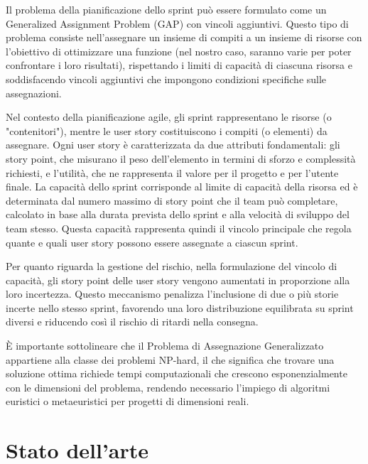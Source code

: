 \documentclass[12pt,a4paper,openright,twoside]{book}
\begin{document}
\vspace{1em}

Il problema della pianificazione dello sprint può essere formulato come un Generalized Assignment Problem (GAP) con vincoli aggiuntivi. Questo tipo di problema consiste nell'assegnare un insieme di compiti a un insieme di risorse con l'obiettivo di ottimizzare una funzione (nel nostro caso, saranno varie per poter confrontare i loro risultati), rispettando i limiti di capacità di ciascuna risorsa e soddisfacendo vincoli aggiuntivi che impongono condizioni specifiche sulle assegnazioni.

\vspace{1em}

Nel  contesto della pianificazione agile, gli sprint rappresentano le risorse (o "contenitori"), mentre le user story costituiscono i compiti (o elementi) da assegnare. Ogni user story è caratterizzata da due attributi fondamentali: gli story point, che misurano il peso dell'elemento in termini di sforzo e complessità richiesti, e l'utilità, che ne rappresenta il valore per il progetto e per l'utente finale. La capacità dello sprint corrisponde al limite di capacità della risorsa ed è determinata dal numero massimo di story point che il team può completare, calcolato in base alla durata prevista dello sprint e alla velocità di sviluppo del team stesso. Questa capacità rappresenta quindi il vincolo principale che regola quante e quali user story possono essere assegnate a ciascun sprint.

\vspace{1em}

Per quanto riguarda la gestione del rischio, nella formulazione del vincolo di capacità, gli story point delle user story vengono aumentati in proporzione alla loro incertezza. Questo meccanismo penalizza l'inclusione di due o più storie incerte nello stesso sprint, favorendo una loro distribuzione equilibrata su sprint diversi e riducendo così il rischio di ritardi nella consegna.

\vspace{1em}

È importante sottolineare che il Problema di Assegnazione Generalizzato appartiene alla classe dei problemi NP-hard, il che significa che trovare una soluzione ottima richiede tempi computazionali che crescono esponenzialmente con le dimensioni del problema, rendendo necessario l'impiego di algoritmi euristici o metaeuristici per progetti di dimensioni reali.


\chapter{Stato dell'arte}
\end{document}
